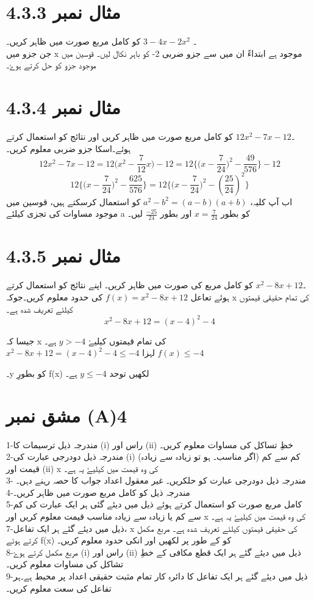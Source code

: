 \section*{ مثال نمبر 4.3.3}
۔ \(3-4x-2x^{2}\) کو کامل مربع صورت میں ظاہر کریں۔\\
 جن جزو میں x موجود ہے ابتداءً ان میں سے جزو ضربی 2- کو باہر نکال لیں۔ قوسین میں موجود جزو کو حل کرتے ہوۓ۔
\section*{ مثال نمبر 4.3.4}
۔\(12x^{2}-7x-12\) کو کامل مربع صورت میں ظاہر کریں اور نتائج کو استعمال کرتے ہوئے۔اسکا جزو ضربی معلوم کریں۔
\[12x^{2}-7x-12=12\big(x^{2}-\frac{7}{12}x\big)-12=12\big\{\big(x-\frac{7}{24}\big)^{2}-\frac{49}{576}\big\}-12\]
\[12\big\{\big(x-\frac{7}{24}\big)^{2}-\frac{625}{576}\big\}=12\big\{\big(x-\frac{7}{24}\big)^{2}-(\frac{25}{24})^{2}\big\}\]
 اب آپ کلیہ، \(a^{2}-b^{2}=(a-b)(a+b)\) کو استعمال کرسکتے ہیں، قوسین میں موجود مساوات کی تجزی کیلئے a کو بطور \(x=\frac{7}{24}\) اور بطور \(\frac{-25}{24}\) لیں۔\\
\section*{ مثال نمبر 4.3.5}
۔\(x^2-8x+12\) کو کامل مربع کی صورت میں ظاہر کریں۔ اپنے نتائج کو استعمال کرتے ہوئے تعاعل \(f(x)=x^2-8x+12\) کی حدود معلوم کریں۔جوکہ x کی تمام حقیقی قیمتوں کیلئے تعریف شدہ ہے۔\\
    \[x^2-8x+12=(x-4)^2-4\]

 جیسا کہ x کی تمام قیمتوں کیلیۓ  \(y>-4\) ہے۔\\
 \(x^2-8x+12=(x-4)^2-4 \leq -4\)
 لہزا
    \(f(x) \leq -4\)
   
۔y کو بطورِ f(x)  لکھیں توحد \(y\leq -4\) ہے۔
 \section*{مشق نمبر (A)4}
 1-مندرجہ ذیل ترسیمات کا (i) راس اور (ii) خظِ تساکل کی مساوات معلوم کریں۔\\
 2-مندرجہ ذیل دودرجی عبارت کی (i) کم سے کم (اگر مناسب۔ ہو تو زیادہ سے زیادہ) قیمت اور (ii) x کی وہ قیمت میں کیلیۓ یہ ہے۔\\
 3- مندرجہ ذیل دودرجی عبارت کو حلکریں۔ غیر معقول اعداد جواب کا حصہ رہنے دہں۔\\
 4-مندرجہ ذیل کو کامل مربع صورت میں ظاہر کریں۔\\
 5-کامل مربع صورت کو استعمال کرتے ہوئے ذیل میں دیئے گئی ہر ایک عبارت کی کم سے کم یا زیادہ سے زیادہ مناسب قیمت معلوم کریں اور x کی وہ قیمت میں کیلیۓ یہ ہے۔\\
\newpage
 7-ذیل میں دیئے گئے ہر ایک تفاعل، x کی  حقیقی قیمتوں کیلئے تعریف شدہ ہے۔ مربع مکمل کرتے ہوئے f(x) کو
 کے طور پر لکھیں اور انکی حدود معلوم کریں۔\\
 8-مربع مکمل کرتے ہوۓ (i) راس اور (ii) ذیل میں دیئے گئے ہر ایک قطع مکافی کے خطِ تشاکل کی مساوات معلوم کریں۔\\
 9-ذیل میں دیئے گئے ہر ایک تفاعل کا دائرہ کار تمام مثبت حقیقی اعداد پر محیط ہے۔ہر تفاعل کی سعت معلوم کریں۔\\
